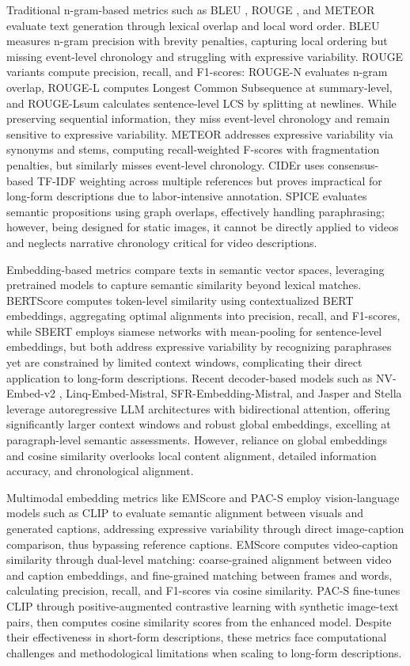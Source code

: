\documentclass[main.tex]{subfiles}
\begin{document}
Traditional n-gram-based metrics such as BLEU \cite{p:02}, ROUGE \cite{l:04}, and METEOR \cite{bl:05} evaluate text generation through lexical overlap and local word order. BLEU measures n-gram precision with brevity penalties, capturing local ordering but missing event-level chronology and struggling with expressive variability. ROUGE variants compute precision, recall, and F1-scores: ROUGE-N evaluates n-gram overlap, ROUGE-L computes Longest Common Subsequence at summary-level, and ROUGE-Lsum calculates sentence-level LCS by splitting at newlines. While preserving sequential information, they miss event-level chronology and remain sensitive to expressive variability. METEOR addresses expressive variability via synonyms and stems, computing recall-weighted F-scores with fragmentation penalties, but similarly misses event-level chronology. CIDEr \cite{v:15} uses consensus-based TF-IDF weighting across multiple references but proves impractical for long-form descriptions due to labor-intensive annotation. SPICE \cite{afjg:16} evaluates semantic propositions using graph overlaps, effectively handling paraphrasing; however, being designed for static images, it cannot be directly applied to videos and neglects narrative chronology critical for video descriptions.

Embedding-based metrics compare texts in semantic vector spaces, leveraging pretrained models to capture semantic similarity beyond lexical matches. BERTScore computes token-level similarity using contextualized BERT embeddings, aggregating optimal alignments into precision, recall, and F1-scores, while SBERT employs siamese networks with mean-pooling for sentence-level embeddings, but both address expressive variability by recognizing paraphrases yet are constrained by limited context windows, complicating their direct application to long-form descriptions. Recent decoder-based models such as NV-Embed-v2 \cite{l:24}, Linq-Embed-Mistral, SFR-Embedding-Mistral, and Jasper and Stella leverage autoregressive LLM architectures with bidirectional attention, offering significantly larger context windows and robust global embeddings, excelling at paragraph-level semantic assessments. However, reliance on global embeddings and cosine similarity overlooks local content alignment, detailed information accuracy, and chronological alignment.

Multimodal embedding metrics like EMScore \cite{syxl:22} and PAC-S employ vision-language models such as CLIP \cite{Radford2021LearningTV} to evaluate semantic alignment between visuals and generated captions, addressing expressive variability through direct image-caption comparison, thus bypassing reference captions. EMScore computes video-caption similarity through dual-level matching: coarse-grained alignment between video and caption embeddings, and fine-grained matching between frames and words, calculating precision, recall, and F1-scores via cosine similarity. PAC-S fine-tunes CLIP through positive-augmented contrastive learning with synthetic image-text pairs, then computes cosine similarity scores from the enhanced model. Despite their effectiveness in short-form descriptions, these metrics face computational challenges and methodological limitations when scaling to long-form descriptions.
\end{document}
